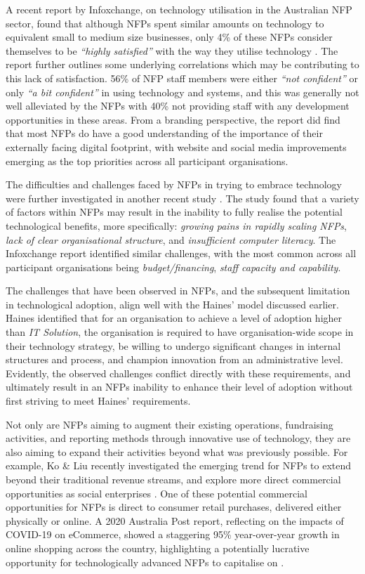 A recent report by Infoxchange, on technology utilisation in the Australian NFP sector, found that although NFPs spent similar amounts on technology to equivalent small to medium size businesses, only 4\% of these NFPs consider themselves to be \emph{“highly satisfied”} with the way they utilise technology \cite{infoxchange_2019}. The report further outlines some underlying correlations which may be contributing to this lack of satisfaction. 56\% of NFP staff members were either \emph{“not confident”} or only \emph{“a bit confident”} in using technology and systems, and this was generally not well alleviated by the NFPs with 40\% not providing staff with any development opportunities in these areas. From a branding perspective, the report did find that most NFPs do have a good understanding of the importance of their externally facing digital footprint, with website and social media improvements emerging as the top priorities across all participant organisations.

The difficulties and challenges faced by NFPs in trying to embrace technology were further investigated in another recent study \cite{le2008view}. The study found that a variety of factors within NFPs may result in the inability to fully realise the potential technological benefits, more specifically: \emph{growing pains in rapidly scaling NFPs}, \emph{lack of clear organisational structure}, and \emph{insufficient computer literacy}. The Infoxchange report identified similar challenges, with the most common across all participant organisations being \emph{budget/financing}, \emph{staff capacity and capability}.

The challenges that have been observed in NFPs, and the subsequent limitation in technological adoption, align well with the Haines' model discussed earlier. Haines identified that for an organisation to achieve a level of adoption higher than \emph{IT Solution}, the organisation is required to have organisation-wide scope in their technology strategy, be willing to undergo significant changes in internal structures and process, and champion innovation from an administrative level. Evidently, the observed challenges conflict directly with these requirements, and ultimately result in an NFPs inability to enhance their level of adoption without first striving to meet Haines' requirements.

Not only are NFPs aiming to augment their existing operations, fundraising activities, and reporting methods through innovative use of technology, they are also aiming to expand their activities beyond what was previously possible. For example, Ko \& Liu recently investigated the emerging trend for NFPs to extend beyond their traditional revenue streams, and explore more direct commercial opportunities as social enterprises \cite{ko2020transformation}. One of these potential commercial opportunities for NFPs is direct to consumer retail purchases, delivered either physically or online. A 2020 Australia Post report, reflecting on the impacts of COVID-19 on eCommerce, showed a staggering 95\% year-over-year growth in online shopping across the country, highlighting a potentially lucrative opportunity for technologically advanced NFPs to capitalise on \cite{auspost2020}.

